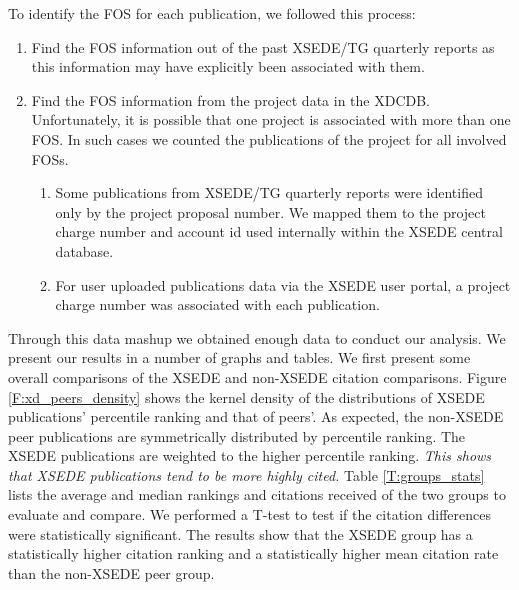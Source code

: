 \documentclass{sig-alternate}
\begin{document}
To identify the FOS for each publication, we followed this process:

\begin{enumerate}

\item Find the FOS information out of the past XSEDE/TG quarterly reports as this information may have explicitly been associated with them.

\item Find the FOS information from the project data in the XDCDB. Unfortunately, it is possible that one project is associated with more than one FOS. In such cases we counted the publications of the project for all involved FOSs.

\begin{enumerate}

\item Some publications from XSEDE/TG quarterly reports were identified only by the project proposal number. We mapped them to the project charge number and account id used internally within the XSEDE central database.

\item For user uploaded publications data via the XSEDE user portal, a project charge number was associated with each publication.

\end{enumerate}

\end{enumerate}

Through this data mashup we obtained enough data to conduct our analysis.
We present our results in a number of graphs and tables. We first present some overall comparisons of the XSEDE and non-XSEDE citation comparisons. Figure \ref{F:xd_peers_density} shows the kernel density of the distributions of XSEDE publications' percentile ranking and that of peers'.  As expected, the non-XSEDE peer publications are symmetrically distributed by percentile ranking.  The XSEDE publications are weighted to the higher percentile ranking. {\em This shows that XSEDE publications tend to be more highly cited.} Table \ref{T:groups_stats} lists the average and median rankings and citations received of the two groups to evaluate and compare. We performed a T-test to test if the citation differences were statistically significant. The results show that the XSEDE group has a statistically higher citation ranking and a statistically higher  mean citation rate than the non-XSEDE peer group.
\end{document}
